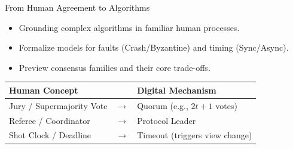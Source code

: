 \documentclass[aspectratio=169]{beamer}
\begin{document}
\begin{frame}{From Human Agreement to Algorithms}
    \begin{itemize}
        \item Grounding complex algorithms in familiar human processes.
        \item Formalize models for faults (Crash/Byzantine) and timing (Sync/Async).
        \item Preview consensus families and their core trade-offs.
    \end{itemize}
    \vfill
    \begin{tcolorbox}[colback=white,colframe=black!20, title={Mapping Intuition to Protocol Mechanics}]
        \centering
        \large
        \renewcommand{\arraystretch}{1.5}
        \begin{tabular}{lcl}
            \textbf{Human Concept} & & \textbf{Digital Mechanism} \\
            \hline
            Jury / Supermajority Vote & $\rightarrow$ & Quorum (e.g., $2t+1$ votes) \cite{castro_practical_1999} \\
            Referee / Coordinator & $\rightarrow$ & Protocol Leader \\
            Shot Clock / Deadline & $\rightarrow$ & Timeout (triggers view change) \cite{10.1145/42282.42283}\\
        \end{tabular}
    \end{tcolorbox}
\end{frame}
\end{document}
